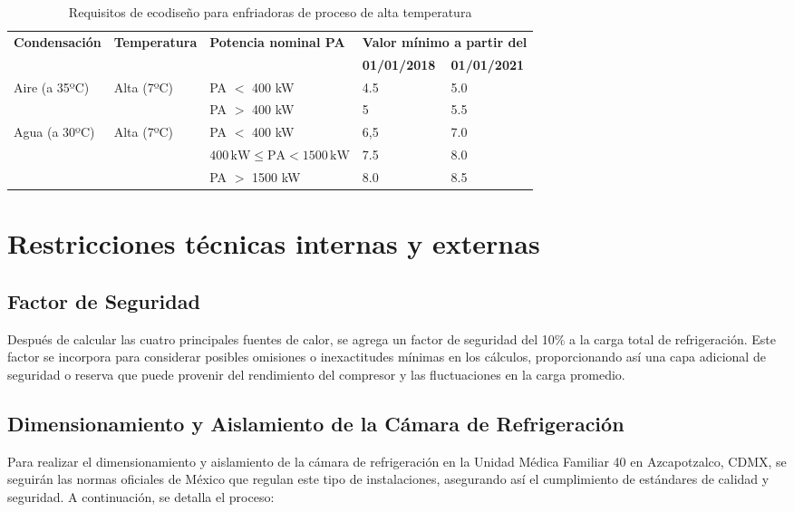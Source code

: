 \begin{table}[H]
	\centering
	\caption{Requisitos de ecodiseño para enfriadoras de proceso de alta temperatura}
	\cite{intarcon-2023}
	\begin{tabular}{lllll}
		\toprule
		\textbf{Condensación} & \textbf{Temperatura} & \textbf{Potencia nominal PA} & \multicolumn{2}{c}{\textbf{Valor mínimo a partir del}}\\
		& & & \textbf{01/01/2018}& \textbf{01/01/2021}\\
		\midrule
		Aire (a 35ºC) & Alta (7ºC) & PA $<$ 400 kW & 4.5&5.0 \\
		& & PA $>$ 400 kW & 5&5.5 \\
		Agua (a 30ºC) & Alta (7ºC) & PA $<$ 400 kW & 6,5&7.0 \\
		& & $400 \, \text{kW} \leq \text{PA} < 1500 \, \text{kW}$ & 7.5 &8.0 \\
		& & PA $>$ 1500 kW & 8.0 &8.5 \\
		\bottomrule
	\end{tabular}
	\label{tabla:enfriadores-alta}
\end{table}

\section{Restricciones técnicas internas y externas} \rsp
 \subsection{Factor de Seguridad}
 Después de calcular las cuatro principales fuentes de calor, se agrega un factor de seguridad del 10\% a la carga total de refrigeración. Este factor se incorpora para considerar posibles omisiones o inexactitudes mínimas en los cálculos, proporcionando así una capa adicional de seguridad o reserva que puede provenir del rendimiento del compresor y las fluctuaciones en la carga promedio.
 \subsection{Dimensionamiento y Aislamiento de la Cámara de Refrigeración}
 
 Para realizar el dimensionamiento y aislamiento de la cámara de refrigeración en la Unidad Médica Familiar 40 en Azcapotzalco, CDMX, se seguirán las normas oficiales de México que regulan este tipo de instalaciones, asegurando así el cumplimiento de estándares de calidad y seguridad. A continuación, se detalla el proceso:
 
